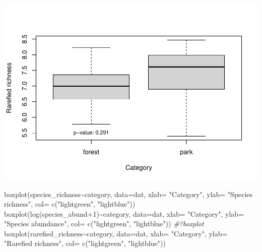 \documentclass[
]{article}
\newenvironment{Shaded}{\begin{snugshade}}{\end{snugshade}}
\newcommand{\AttributeTok}[1]{\textcolor[rgb]{0.77,0.63,0.00}{#1}}
\newcommand{\CommentTok}[1]{\textcolor[rgb]{0.56,0.35,0.01}{\textit{#1}}}
\newcommand{\DecValTok}[1]{\textcolor[rgb]{0.00,0.00,0.81}{#1}}
\newcommand{\FunctionTok}[1]{\textcolor[rgb]{0.00,0.00,0.00}{#1}}
\newcommand{\NormalTok}[1]{#1}
\newcommand{\SpecialCharTok}[1]{\textcolor[rgb]{0.00,0.00,0.00}{#1}}
\newcommand{\StringTok}[1]{\textcolor[rgb]{0.31,0.60,0.02}{#1}}
\begin{document}
\includegraphics{birdsdataanalysis_files/figure-latex/unnamed-chunk-5-7.pdf}

\begin{Shaded}
\begin{Highlighting}[]
\FunctionTok{boxplot}\NormalTok{(species\_richness}\SpecialCharTok{\textasciitilde{}}\NormalTok{category, }\AttributeTok{data=}\NormalTok{dat, }\AttributeTok{xlab=} \StringTok{"Category"}\NormalTok{, }\AttributeTok{ylab=} \StringTok{"Species richness"}\NormalTok{, }\AttributeTok{col=} \FunctionTok{c}\NormalTok{(}\StringTok{"lightgreen"}\NormalTok{, }\StringTok{"lightblue"}\NormalTok{))}
\FunctionTok{boxplot}\NormalTok{(}\FunctionTok{log}\NormalTok{(species\_abund}\SpecialCharTok{+}\DecValTok{1}\NormalTok{)}\SpecialCharTok{\textasciitilde{}}\NormalTok{category, }\AttributeTok{data=}\NormalTok{dat, }\AttributeTok{xlab=} \StringTok{"Category"}\NormalTok{, }\AttributeTok{ylab=} \StringTok{"Species abundance"}\NormalTok{, }\AttributeTok{col=} \FunctionTok{c}\NormalTok{(}\StringTok{"lightgreen"}\NormalTok{, }\StringTok{"lightblue"}\NormalTok{))}
\CommentTok{\#?boxplot}
\FunctionTok{boxplot}\NormalTok{(rarefied\_richness}\SpecialCharTok{\textasciitilde{}}\NormalTok{category, }\AttributeTok{data=}\NormalTok{dat, }\AttributeTok{xlab=} \StringTok{"Category"}\NormalTok{, }\AttributeTok{ylab=} \StringTok{"Rarefied richness"}\NormalTok{, }\AttributeTok{col=} \FunctionTok{c}\NormalTok{(}\StringTok{"lightgreen"}\NormalTok{, }\StringTok{"lightblue"}\NormalTok{))}
\end{Highlighting}
\end{Shaded}
\end{document}
